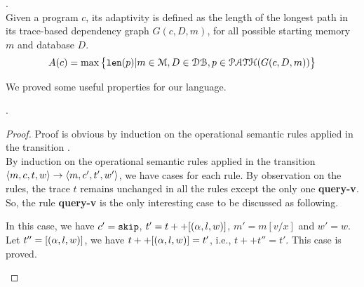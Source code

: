\documentclass[a4paper,11pt]{article}
\begin{document}
%
%
\begin{defn}.
\label{def:trace-based_adapt}
\\
Given a program $c$, 
its adaptivity is defined as the length of the longest path in its
trace-based dependency graph $G(c,D,m)$, 
for all possible starting memory $m$ and database $D$.
%
$$
A(c) = \max \big \{ 
\mathtt{len}(p) \vert m \in \mathcal{M}, D \in \mathcal{DB},p \in \mathcal{PATH}(G(c, D, m)) 
\big \} 
$$
\end{defn}
%
We proved some useful properties for our language.
\begin{lem}
.
\\
\end{lem}
%
\begin{proof}
{
Proof is obvious by induction on the operational semantic rules applied in the transition 
.
\\
By induction on the operational semantic rules applied in the transition $\langle m, c, t, w \rangle 
\rightarrow
\langle m, c', t', w' \rangle$, 
we have cases for each rule.
By observation on the rules, 
the trace $t$ remains unchanged in all the rules except the only one \textbf{query-v}.
So, the rule \textbf{query-v} is the only interesting case to be discussed as following.
\begin{itemize}
\caseL{
\[
	\inferrule
	{
	\query(\qval) = v
	}
	{
	\config{m, [\assign{x}{\query(\qval)}]^l, t, w} \xrightarrow{}  
	\config{m, \eskip, t ++ [(\qval, l, w)], w}
	}
	~\textbf{query-v}
\]
}
%
In this case, we have $c' = \mathtt{skip}$, 
$t' = t ++ [(\alpha, l, w)]$, $m' = m[v/x]$ and $w' = w$.
\\
Let $t'' = [(\alpha, l, w)]$, we have $t ++ [(\alpha, l, w)] = t'$,
i.e., $t ++ t'' = t'$. This case is proved.
\end{itemize}
}
\end{proof}
%
\end{document}
